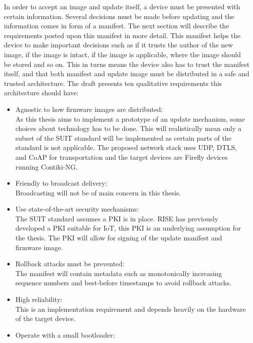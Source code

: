 \documentclass[0-thesis.tex]{subfiles}
\begin{document}
In order to accept an image and update itself, a device must be presented with certain 
information. Several decisions must be made before updating and the information comes in 
form of a manifest. The next section will describe the requirements posted upon this 
manifest in more detail. This manifest helps the device to make important decisions such as 
if it trusts the author of the new image, if the image is intact, if the image is applicable,
where the image should be stored and so on. This in turns means the device also has to trust 
the manifest itself, and that both manifest and update image must be distributed in a safe and 
trusted architecture. The draft \parencite{suit-architecture} presents ten qualitative 
requirements this architecture should have:
\begin{itemize}
    \item Agnostic to how firmware images are distributed:\\
            As this thesis aims to implement a prototype of an update mechanism, 
            some choices about technology has to be done. This will realistically mean 
            only a subset of the SUIT standard will be implemented as certain parts of the 
            standard is not applicable. The proposed network stack uses UDP, DTLS, and CoAP 
            for transportation and the target devices are Firefly devices running Contiki-NG.
    \item Friendly to broadcast delivery:\\
            Broadcasting will not be of main concern in this thesis.
    \item Use state-of-the-art security mechanisms:\\
            The SUIT standard assumes a PKI is in place. RISE has previously developed a PKI
            suitable for IoT, this PKI is an underlying assumption for the thesis. The PKI 
            will allow for signing of the update manifest and firmware image.
    \item Rollback attacks must be prevented:\\
            The manifest will contain metadata such as monotonically increasing sequence 
            numbers and best-before timestamps to avoid rollback attacks.
    \item High reliability:\\
            This is an implementation requirement and depends heavily on the hardware of the 
            target device. %
    \item Operate with a small bootloader:\\

\end{itemize}
\end{document}
